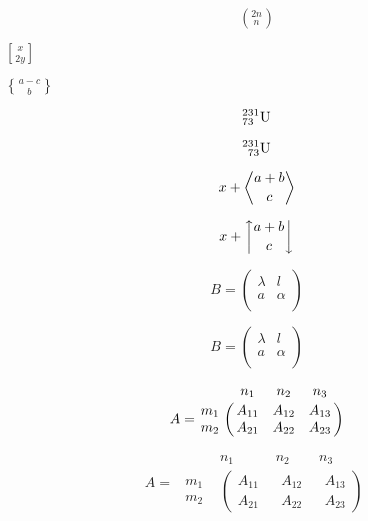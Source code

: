 \documentclass[11pt]{article}
\begin{document}
$$(_{\ n\,}^{2n})$$

$x \brack 2y$

$a-c \brace b$

$${}_{ 73}^{231}{\rm U}$$

$${}_{\phantom{0}73}^{231}{\rm U}$$

$$x+{a+b \atopwithdelims<> c}$$

$$x+{a+b \atopwithdelims\uparrow\downarrow c}$$


$$B = 
\begin{pmatrix}
\lambda & l \\
a & \alpha \\
\end{pmatrix}$$

$$B=\left(
\begin{array}{cc}
\lambda & l \\
a & \alpha \\
\end{array}
\right)$$

$$A=\bordermatrix{& n_1 & n_2 & n_3 \cr
m_1 & A_{11} & A_{12} & A_{13} \cr
m_2 & A_{21} & A_{22} & A_{23} \cr}$$

\[
A = 
\begin{array}{cccc}
& n_1 & n_2 & n_3 \\
\begin{array}{c} m_1 \\ m_2 \end{array} &
\left(
\begin{array}{c} A_{11} \\ A_{21} \end{array} \right. &
\begin{array}{c} A_{12} \\ A_{22} \end{array} &
\left. \begin{array}{c} A_{13} \\ A_{23} \end{array}\right)
\end{array}
\]
\end{document}
